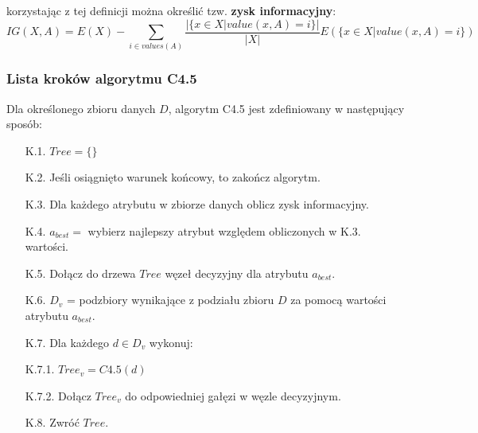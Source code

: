    \noindent korzystając z tej definicji można określić tzw. \textbf{zysk informacyjny}:
    $$ IG(X, A) = E(X) - \sum_{i \in values(A)} \frac{|\{x \in X | value(x, A) = i\}|}{|X|} E(\{x \in X | value(x, A) = i\}) $$
  
    \pagebreak
    \subsubsection*{Lista kroków algorytmu C4.5}
    Dla określonego zbioru danych $D$, algorytm C4.5 jest zdefiniowany w następujący sposób:
    \begin{itemize}
      \item[K.1.]{$Tree = \{\}$}
      \item[K.2.]{Jeśli osiągnięto warunek końcowy, to zakończ algorytm.}
      \item[K.3.]{Dla każdego atrybutu w zbiorze danych oblicz zysk informacyjny.}
      \item[K.4.]{$a_{best} = $ wybierz najlepszy atrybut względem obliczonych w K.3. wartości.}
      \item[K.5.]{Dołącz do drzewa $Tree$ węzeł decyzyjny dla atrybutu $a_{best}$.}
      \item[K.6.]{$D_v$ = podzbiory wynikające z podziału zbioru $D$ za pomocą wartości atrybutu $a_{best}$.}
      \item[K.7.]{Dla każdego $d \in D_v$ wykonuj:}
      \item[K.7.1.]{$Tree_v = C4.5(d)$}
      \item[K.7.2.]{Dołącz $Tree_v$ do odpowiedniej gałęzi w węzle decyzyjnym.}
      \item[K.8.]{Zwróć $Tree$.}
    \end{itemize}

